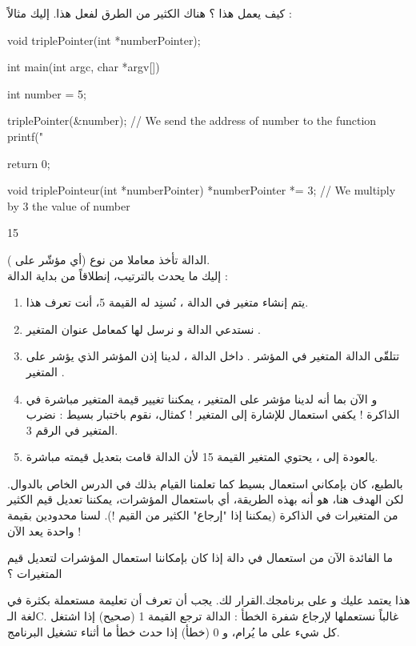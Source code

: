كيف يعمل هذا ؟ هناك الكثير من الطرق لفعل هذا. إليك مثالاً :
\begin{Csource}
void triplePointer(int *numberPointer);

int main(int argc, char *argv[])
{
	int number = 5;

	triplePointer(&number); // We send the address of number to the function
	printf("%

	return 0;
}

void triplePointeur(int *numberPointer)
{
	*numberPointer *= 3; // We multiply by 3 the value of number
}
\end{Csource}
\begin{Console}
15
\end{Console}
الدالة
تأخذ معاملا من نوع
(أي مؤشّر على
).\\
إليك ما يحدث بالترتيب، إنطلاقاً من بداية الدالة
 :
\begin{enumerate}
	\item يتم إنشاء متغير
في الدالة
،
نُسنِد له القيمة 5، أنت تعرف هذا.
	\item نستدعي الدالة
و نرسل لها كمعامل عنوان المتغير
.
	\item تتلقّى الدالة
المتغير في المؤشر
.
داخل الدالة
، لدينا إذن المؤشر
الذي يؤشر على المتغير
.
	\item و الآن بما أنه لدينا مؤشر على المتغير
،
يمكننا تغيير قيمة المتغير
مباشرة في الذاكرة ! يكفي استعمال
للإشارة إلى المتغير
 !
كمثال، نقوم باختبار بسيط : نضرب المتغير في الرقم 3.
	\item يالعودة إلى
،
يحتوي المتغير
القيمة 15 لأن الدالة
قامت بتعديل قيمته مباشرة.
\end{enumerate}
بالطبع، كان بإمكاني استعمال
بسيط كما تعلمنا القيام بذلك في الدرس الخاص بالدوال. لكن الهدف هنا، هو أنه بهذه الطريقة، أي باستعمال المؤشرات، يمكننا تعديل قيم الكثير من المتغيرات في الذاكرة (يمكننا إذا "إرجاع" الكثير من القيم !). لسنا محدودين بقيمة واحدة يعد الآن !
\begin{question}
	ما الفائدة الآن من استعمال
في دالة إذا كان بإمكاننا استعمال المؤشرات لتعديل قيم المتغيرات ؟
\end{question}
هذا يعتمد عليك و على برنامجك.القرار لك. يجب أن تعرف أن تعليمة
مستعملة بكثرة في لغة الـ\textenglish{C}.
غالباً نستعملها لإرجاع شفرة الخطأ : الدالة ترجع القيمة 1 (صحيح) إذا اشتغل كل شيء على ما يُرام، و 0 (خطأ) إذا حدث خطأ ما أثناء تشغيل البرنامج.

